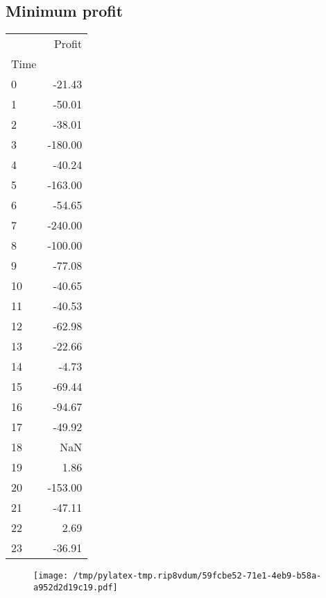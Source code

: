 \documentclass{article}%
\begin{document}
\subsection{Minimum profit }%
\label{subsec:Minimumprofit}%
\begin{tabular}{lr}
\toprule
{} &  Profit \\
Time &         \\
\midrule
0    &  -21.43 \\
1    &  -50.01 \\
2    &  -38.01 \\
3    & -180.00 \\
4    &  -40.24 \\
5    & -163.00 \\
6    &  -54.65 \\
7    & -240.00 \\
8    & -100.00 \\
9    &  -77.08 \\
10   &  -40.65 \\
11   &  -40.53 \\
12   &  -62.98 \\
13   &  -22.66 \\
14   &   -4.73 \\
15   &  -69.44 \\
16   &  -94.67 \\
17   &  -49.92 \\
18   &     NaN \\
19   &    1.86 \\
20   & -153.00 \\
21   &  -47.11 \\
22   &    2.69 \\
23   &  -36.91 \\
\bottomrule
\end{tabular}
%


\begin{figure}[htbp]%
\centering%
\texttt{[image: /tmp/pylatex-tmp.rip8vdum/59fcbe52-71e1-4eb9-b58a-a952d2d19c19.pdf]}%
\end{figure}

%
\newpage %
\end{document}
